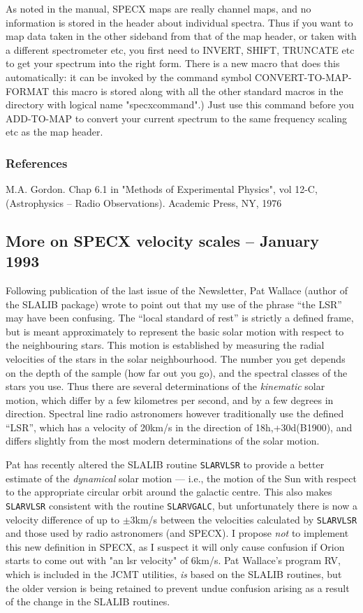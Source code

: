 \documentclass[twoside,11pt]{article}
\newcommand{\xref}[3]{#1}
\renewcommand{\_}{\texttt{\symbol{95}}}
\begin{document}
As noted in the manual, SPECX maps are really channel maps, and no information
is stored in the header about individual spectra. Thus if you want to map data
taken in the other sideband from that of the map header, or taken with a
different spectrometer etc, you first need to INVERT, SHIFT, TRUNCATE etc to
get your spectrum into the right form. There is a new macro that does this
automatically: it can be invoked by the command symbol CONVERT-TO-MAP-FORMAT
this macro is stored along with all the other standard macros in the directory
with logical name "specx\_command".) Just use this command before you
ADD-TO-MAP to convert your current spectrum to the same frequency scaling etc
as the map header.

\subsubsection{References}

M.A. Gordon. Chap 6.1 in "Methods of Experimental Physics", vol 12-C,
    (Astrophysics -- Radio Observations). Academic Press, NY, 1976


\subsection{More on SPECX velocity scales -- January 1993}

Following publication of the last issue of the Newsletter, Pat Wallace (author
of the \xref{SLALIB}{sun67}{} package) wrote to point out that my use of the
phrase ``the LSR'' may have been confusing. The ``local standard of rest'' is
strictly a defined frame, but is meant approximately to represent the basic
solar motion with respect to the neighbouring stars. This motion is
established by measuring the radial velocities of the stars in the solar
neighbourhood. The number you get depends on the depth of the sample (how far
out you go), and the spectral classes of the stars you use. Thus there are
several determinations of the \emph{kinematic} solar motion, which differ by a
few kilometres per second, and by a few degrees in direction. Spectral line
radio astronomers however traditionally use the defined ``LSR'', which has a
velocity of 20km/s in the direction of 18h,+30d(B1900), and differs slightly
from the most modern determinations of the solar motion.

Pat has recently altered the SLALIB routine \texttt{SLA\_RVLSR} to provide a
better estimate of the {\em dynamical} solar motion --- i.e., the motion of
the Sun with respect to the appropriate circular orbit around the galactic
centre.  This also makes \texttt{SLA\_RVLSR} consistent with the routine
\texttt{SLA\_RVGALC}, but unfortunately there is now a velocity difference of
up to $\pm 3$km/s between the velocities calculated by \texttt{SLA\_RVLSR} and
those used by radio astronomers (and SPECX). I propose {\em not} to implement
this new definition in SPECX, as I suspect it will only cause confusion if
Orion starts to come out with "an lsr velocity" of 6km/s. Pat Wallace's
program \xref{RV}{sun78}{}, which is included in the JCMT utilities, {\em is}
based on the SLALIB routines, but the older version is being retained to
prevent undue confusion arising as a result of the change in the SLALIB
routines.
\end{document}
